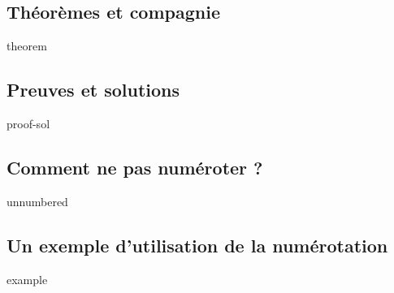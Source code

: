 \subsection{Théorèmes et compagnie}

{theorem}



\subsection{Preuves et solutions}

{proof-sol}



\subsection{Comment ne pas numéroter ?}

{unnumbered}



\subsection{Un exemple d'utilisation de la numérotation}

{example}